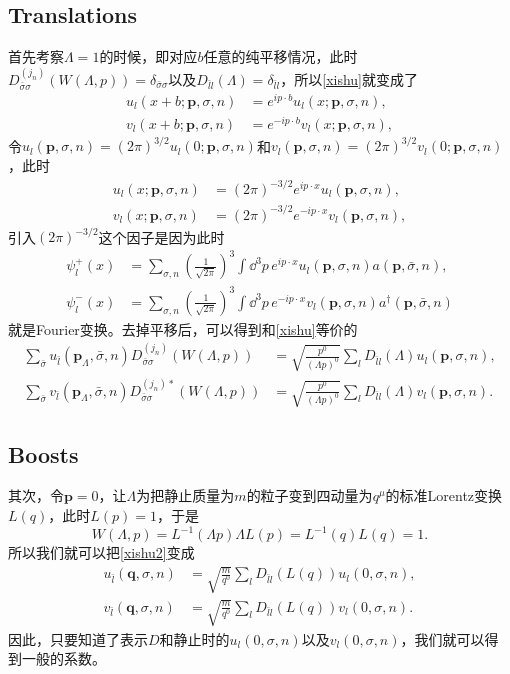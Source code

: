 \documentclass[9pt]{extbook}
\theoremstyle{plain}%
\begin{document}
\subsection*{Translations}
首先考察$\Lambda=1$的时候，即对应$b$任意的纯平移情况，此时$D^{(j_n)}_{\bar{\sigma}\sigma}\left(W(\Lambda,p)\right)=\delta_{\bar{\sigma}\sigma}$以及$D_{\bar{l}l}(\Lambda)=\delta_{\bar{l}l}$，所以\eqref{xishu}就变成了
\[
	\begin{split}
		u_{l}(x+b;\mathbf{p},\sigma,n)&=e^{i p\cdot b}u_{l}(x;\mathbf{p},\sigma,n),\\
		v_{l}(x+b;\mathbf{p},\sigma,n)&=e^{-i p\cdot b}v_{l}(x;\mathbf{p},\sigma,n),
	\end{split}
\]
令$u_{l}(\mathbf{p},\sigma,n)=(2\pi)^{3/2}u_{l}(0;\mathbf{p},\sigma,n)$和$v_{l}(\mathbf{p},\sigma,n)=(2\pi)^{3/2}v_{l}(0;\mathbf{p},\sigma,n)$，此时
\[
	\begin{split}
		u_{l}(x;\mathbf{p},\sigma,n)&=(2\pi)^{-3/2}e^{i p\cdot x}u_{l}(\mathbf{p},\sigma,n),\\
		v_{l}(x;\mathbf{p},\sigma,n)&=(2\pi)^{-3/2}e^{-ip\cdot x}v_{l}(\mathbf{p},\sigma,n),
	\end{split}
\]
引入$(2\pi)^{-3/2}$这个因子是因为此时
\[
\begin{split}
	\psi_l^{+}(x)&=\sum_{\sigma,n}\left(\frac{1}{\sqrt{2\pi}}\right)^{3}\int \dd^3 p\, e^{ip\cdot x}u_{l}(\mathbf{p},\sigma,n)a(\mathbf{p},\bar{\sigma},n),\\
	\psi_l^{-}(x)&=\sum_{\sigma,n}\left(\frac{1}{\sqrt{2\pi}}\right)^{3}\int \dd^3 p\, e^{-ip\cdot x}v_{l}(\mathbf{p},\sigma,n)a^\dag(\mathbf{p},\bar{\sigma},n)
\end{split}
\]
就是Fourier变换。去掉平移后，可以得到和\eqref{xishu}等价的
\begin{equation}
	\begin{split}
		\sum_{\bar{\sigma}}u_{\bar{l}}(\mathbf{p}_\Lambda,\bar{\sigma},n)D^{(j_n)}_{\bar{\sigma}\sigma}\left(W(\Lambda,p)\right)&=\sqrt{\frac{p^0}{(\Lambda p)^0}}\sum_{l} D_{\bar{l}l}(\Lambda)u_{l}(\mathbf{p},\sigma,n),\\
		\sum_{\bar{\sigma}}v_{\bar{l}}(\mathbf{p}_\Lambda,\bar{\sigma},n)D^{(j_n)*}_{\bar{\sigma}\sigma}\left(W(\Lambda,p)\right)&=\sqrt{\frac{p^0}{(\Lambda p)^0}}\sum_{l} D_{\bar{l}l}(\Lambda)v_{l}(\mathbf{p},\sigma,n).
	\end{split}
	\label{xishu2}
\end{equation}
\subsection*{Boosts}
其次，令$\mathbf{p}=0$，让$\Lambda$为把静止质量为$m$的粒子变到四动量为$q^\mu$的标准Lorentz变换$L(q)$，此时$L(p)=1$，于是
\[
	W(\Lambda,p)=L^{-1}(\Lambda p)\Lambda L(p)=L^{-1}(q)L(q)=1.
\]
所以我们就可以把\eqref{xishu2}变成
\[
	\begin{split}
		u_{\bar{l}}(\mathbf{q},\sigma,n)&=\sqrt{\frac{m}{q^0}}\sum_{l} D_{\bar{l}l}(L(q))u_{l}(0,\sigma,n),\\
		v_{\bar{l}}(\mathbf{q},\sigma,n)&=\sqrt{\frac{m}{q^0}}\sum_{l} D_{\bar{l}l}(L(q))v_{l}(0,\sigma,n).
	\end{split}
\]
因此，只要知道了表示$D$和静止时的$u_{l}(0,\sigma,n)$以及$v_{l}(0,\sigma,n)$，我们就可以得到一般的系数。
\end{document}
